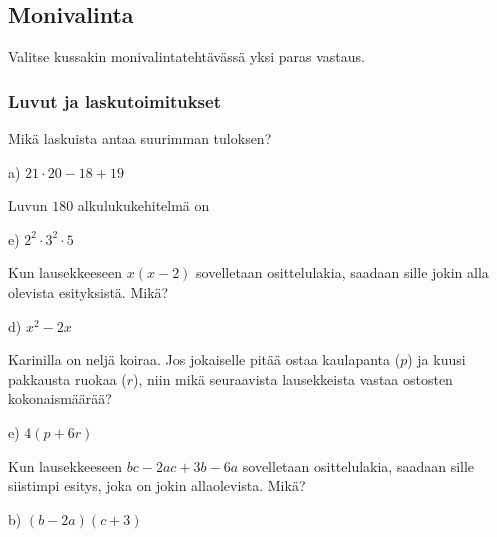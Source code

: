 \newpage
\subsection*{Monivalinta}

Valitse kussakin monivalintatehtävässä yksi paras vastaus.


\subsubsection*{Luvut ja laskutoimitukset}


\begin{tehtava}
Mikä laskuista antaa suurimman tuloksen?
	\begin{vastaus}
	 a) $21\cdot 20-18+19$
	\end{vastaus}
\end{tehtava}

\begin{tehtava}
Luvun $180$ alkulukukehitelmä on
	\begin{vastaus}
	 e) $2^2\cdot3^2\cdot5$
	\end{vastaus}
\end{tehtava}

\begin{tehtava}
Kun lausekkeeseen $x(x-2)$ sovelletaan osittelulakia, saadaan sille jokin alla olevista esityksistä. Mikä?
    \begin{vastaus}
	d) $x^2-2x$
    \end{vastaus}
\end{tehtava}

\begin{tehtava}
Karinilla on neljä koiraa. Jos jokaiselle pitää ostaa kaulapanta ($p$) ja kuusi pakkausta ruokaa ($r$), niin mikä seuraavista lausekkeista vastaa ostosten kokonaismäärää?
    \begin{vastaus}
	e) $4(p+6r)$
    \end{vastaus}
\end{tehtava}

\begin{tehtava}
Kun lausekkeeseen $bc-2ac+3b-6a$ sovelletaan osittelulakia, saadaan sille siistimpi esitys, joka on jokin allaolevista. Mikä?
    \begin{vastaus}
	b) $(b-2a)(c+3)$
    \end{vastaus}
\end{tehtava}

